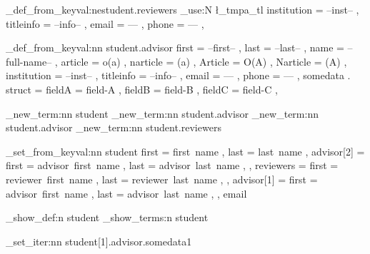 \documentclass[dctools,english]{ufrgscca}
\begin{document}
        \starray_def_from_keyval:ne{student.reviewers}
        {
          \tl_use:N \l_tmpa_tl
          institution = --inst-- ,
          titleinfo = --info-- ,
          email = --- ,
          phone = --- ,
        }

        \starray_def_from_keyval:nn {student.advisor}
        {
          first = --first-- ,
          last = --last-- ,
          name = --full-name-- ,
          article = o(a) ,
          narticle = (a) ,
          Article = O(A) ,
          Narticle = (A) ,
          institution = --inst-- ,
          titleinfo = --info-- ,
          email = --- ,
          phone = --- ,
          somedata . struct = {
            fieldA = field-A ,
            fieldB = field-B ,
            fieldC = field-C ,
          }
        }


        \starray_new_term:nn {student}{}
        \starray_new_term:nn {student.advisor}{}
        \starray_new_term:nn {student.advisor}{}
        \starray_new_term:nn {student.reviewers}{}


        \starray_set_from_keyval:nn
        {student}
        {
          first = first~name ,
          last = last~name ,
          advisor[2] = {
            first = advisor~first~name ,
            last  = advisor~last~name ,
          } ,
          reviewers = {
            first = reviewer~first~name ,
            last  = reviewer~last~name ,
          } ,
          advisor[1] = {
            first = advisor~first~name ,
            last  = advisor~last~name ,
          } ,
          email
        }

        \starray_show_def:n {student}
        \starray_show_terms:n {student}

        \starray_set_iter:nn {student[1].advisor.somedata}{1}

\ExplSyntaxOff
\end{document}
